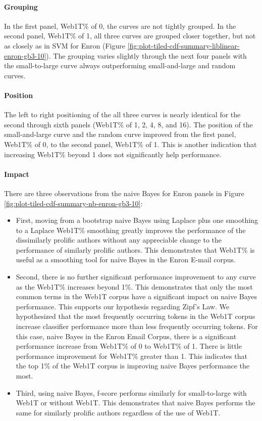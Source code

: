 	\paragraph*{Grouping}In the first panel, Web1T\% of 0, the curves are not tightly grouped. In the second panel, Web1T\% of 1, all three curves are grouped closer together, but not as closely as in SVM for Enron (Figure \ref{fig:plot-tiled-cdf-summary-liblinear-enron-gb3-10}).  The grouping varies slightly through the next four panels with the small-to-large curve always outperforming small-and-large and random curves. 
	\paragraph*{Position}The left to right positioning of the all three curves is nearly identical for the second through sixth panels (Web1T\% of 1, 2, 4, 8, and 16).  The position of the small-and-large curve and the random curve improved from the first panel, Web1T\% of 0, to the second panel, Web1T\% of 1.  This is another indication that increasing Web1T\%  beyond 1 does not significantly help performance.
	\paragraph*{Impact} There are three observations from the naive Bayes for Enron panels in Figure \ref{fig:plot-tiled-cdf-summary-nb-enron-gb3-10}:
	\begin{itemize}
	\item First, moving from a bootstrap naive Bayes using Laplace plus one smoothing to a Laplace Web1T\% smoothing greatly improves the performance of the dissimilarly prolific authors without any appreciable change to the performance of similarly prolific authors.  This demonstrates that Web1T\% is useful as a smoothing tool for naive Bayes in the Enron E-mail corpus.  
	\item Second, there is no further significant performance improvement to any curve as the Web1T\% increases beyond 1\%.  This demonstrates that only the most common terms in the Web1T corpus have a significant impact on naive Bayes performance. This supports our hypothesis regarding Zipf's Law.  We hypothesized that the most frequently occurring tokens in the Web1T corpus increase classifier performance more than less frequently occurring tokens.  For this case, naive Bayes in the Enron Email Corpus, there is a significant performance increase from Web1T\% of 0 to Web1T\% of 1.  There is little performance improvement for Web1T\% greater than 1.  This indicates that the top 1\% of the Web1T corpus is improving naive Bayes performance the most.
	\item Third, using naive Bayes, f-score performs similarly for small-to-large with Web1T or without Web1T.  This demonstrates that naive Bayes performs the same for similarly prolific authors regardless of the use of Web1T. 
	\end{itemize}
	
